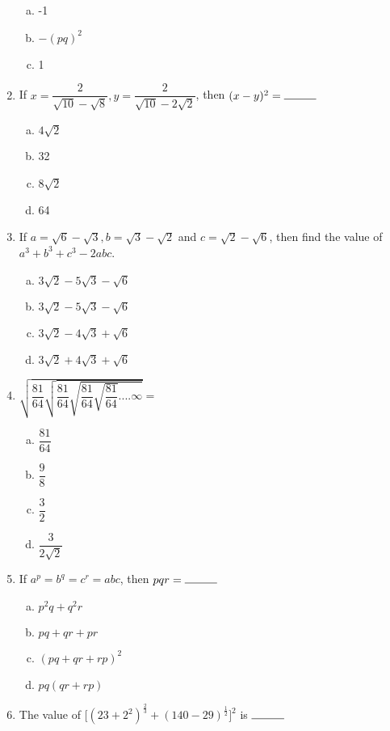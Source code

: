 \begin{multicols}{2}
\begin{enumerate}
\begin{multicols}{2}
\begin{enumerate}[(a)]
\item -1
\item $-(pq)^2$ 
\item 1
\end{enumerate}
\end{multicols}
\item If $x = \dfrac{2}{\sqrt{10}-\sqrt{8}}, y = \dfrac{2}{\sqrt{10}-2\sqrt{2}}$, then $(x-y)^2 = \rule{1cm}{0.15mm}$
\begin{multicols}{2}
\begin{enumerate}[(a)]
\item $4\sqrt{2}$
\item 32
\item  $8\sqrt{2}$
\item 64
\end{enumerate}
\end{multicols}
\item If $a = \sqrt{6}-\sqrt{3}, b = \sqrt{3}-\sqrt{2}$ and $c = \sqrt{2}-\sqrt{6}$, then find the value of $a^3+b^3+c^3-2abc$.
\begin{enumerate}[(a)]
\item $3\sqrt{2}-5\sqrt{3}-\sqrt{6}$
\item $3\sqrt{2}-5\sqrt{3}-\sqrt{6}$
\item  $3\sqrt{2}-4\sqrt{3}+\sqrt{6}$
\item $3\sqrt{2}+4\sqrt{3}+\sqrt{6}$
\end{enumerate}
\item $\sqrt{\dfrac{81}{64}\sqrt{\dfrac{81}{64}\sqrt{\dfrac{81}{64}\sqrt{\dfrac{81}{64}}....\infty}}} = $
\begin{multicols}{2}
\begin{enumerate}[(a)]
\item $\dfrac{81}{64}$
\item $\dfrac{9}{8}$
\item $\dfrac{3}{2}$
\item $\dfrac{3}{2\sqrt{2}}$
\end{enumerate}
\end{multicols}
\item If $a^p = b^q = c^r = abc$, then $pqr = \rule{1cm}{0.15mm} $
\begin{enumerate}[(a)]
\item $p^2q+q^2r$
\item $pq+qr+pr$
\item $(pq+qr+rp)^2$
\item $pq(qr+rp)$
\end{enumerate}
\item The value of $\Bigg[(23+2^2)^{\frac{2}{3}}+(140-29)^{\frac{1}{2}}\Bigg]^2$ is $\rule{1cm}{0.15mm}$

\end{enumerate}
\end{multicols}
